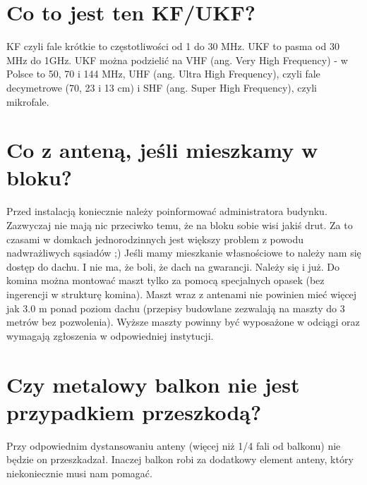 \documentclass[a4paper,12pt]{article}
\begin{document}
\section{Co to jest ten KF/UKF?}
KF czyli fale krótkie to częstotliwości od 1 do 30 MHz.
UKF to pasma od 30 MHz do 1GHz. 
UKF można podzielić na VHF (ang. Very High Frequency) - w Polsce to 50, 70 i 144 MHz, UHF (ang. Ultra High Frequency), czyli fale decymetrowe (70, 23 i 13 cm) i SHF (ang. Super High Frequency), czyli mikrofale.

\section{Co z anteną, jeśli mieszkamy w bloku?}
Przed instalacją koniecznie należy poinformować administratora budynku. Zazwyczaj nie mają nic przeciwko temu, że na bloku sobie wisi jakiś drut. Za to czasami w domkach jednorodzinnych jest większy problem z powodu nadwrażliwych sąsiadów ;)
Jeśli mamy mieszkanie własnościowe to należy nam się dostęp do dachu. I nie ma, że boli, że dach na gwarancji. Należy się i już.
Do komina można montować maszt tylko za pomocą specjalnych opasek (bez ingerencji w strukturę komina). Maszt wraz z antenami nie powinien mieć więcej jak 3.0 m ponad poziom dachu (przepisy budowlane zezwalają na maszty do 3 metrów bez pozwolenia). Wyższe maszty powinny być wyposażone w odciągi oraz wymagają zgłoszenia w odpowiedniej instytucji.

\section{Czy metalowy balkon nie jest przypadkiem przeszkodą?}
Przy odpowiednim dystansowaniu anteny (więcej niż 1/4 fali od balkonu) nie będzie on przeszkadzał. Inaczej balkon robi za dodatkowy element anteny, który niekoniecznie musi nam pomagać.
\end{document}
